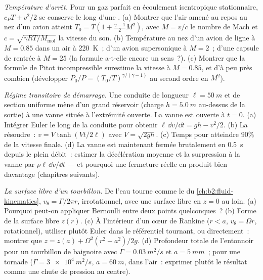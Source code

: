 \begin{exercise}[$\star\star\star$]\label{exo:b2:euler-bernoulli:10}
\emph{Température d'arrêt.} Pour un gaz parfait en écoulement isentropique
stationnaire, $c_PT + v^2/2$ se conserve le long d'une . (a) Montrer que
l'air amené au repos au nez d'un avion atteint $T_0 = T(1 +
\tfrac{\gamma - 1}{2}M^2)$, avec $M = v/c$ le nombre de Mach et $c =
\sqrt{\gamma RT/M_{\text{mol}}}$ la vitesse du son. (b) Température au nez
d'un avion de ligne à $M = 0.85$ dans un air à \qty{220}{K}~; d'un avion
supersonique à $M = 2$~; d'une capsule de rentrée à $M = 25$ (la formule
a-t-elle encore un sens~?). (c) Montrer que la formule de Pitot incompressible
surestime la vitesse à $M = 0.85$, et d'à peu près combien (développer
$P_0/P = (T_0/T)^{\gamma/(\gamma - 1)}$ au second ordre en $M^2$).
\end{exercise}

\begin{exercise}[$\star\star\star$]\label{exo:b2:euler-bernoulli:11}
\emph{Régime transitoire de démarrage.} Une conduite de longueur $\ell = \qty{50}{m}$ et de section
uniforme mène d'un grand réservoir (charge $h = \qty{5.0}{m}$ au-dessus de la
sortie) à une vanne située à l'extrémité ouverte. La vanne est ouverte à $t = 0$. (a)
Intégrer Euler le long de la conduite pour obtenir $\ell\,\dd v/\dd t = gh - v^2/2$.
(b) La résoudre~: $v = V\tanh(Vt/2\ell)$ avec $V = \sqrt{2gh}$. (c) Temps pour
atteindre $90\%$ de la vitesse finale. (d) La vanne est maintenant fermée brutalement en
\qty{0.5}{s} depuis le plein débit~: estimer la décélération moyenne et la
surpression à la vanne par $\rho\ell\,\dd v/\dd t$ --- et pourquoi une fermeture réelle
en produit bien davantage (chapitres suivants).
\end{exercise}

\begin{exercise}[$\star\star\star$]\label{exo:b2:euler-bernoulli:12}
\emph{La surface libre d'un tourbillon.} De l'eau tourne comme le 
du \cref{ch:b2:fluid-kinematics}, $v_\theta = \Gamma/2\pi r$, irrotationnel,
avec une surface libre en $z = 0$ au loin. (a) Pourquoi peut-on appliquer Bernoulli
entre deux points quelconques~? (b) Forme de la surface libre $z(r)$. (c)
À l'intérieur d'un cœur de Rankine ($r < a$, $v_\theta = \Omega r$, rotationnel), utiliser
plutôt Euler dans le référentiel tournant, ou directement~: montrer que $z = z(a) +
\Omega^2(r^2 - a^2)/2g$. (d) Profondeur totale de l'entonnoir pour un tourbillon
de baignoire avec $\Gamma = \qty{0.03}{m^2/s}$ et $a = \qty{5}{mm}$~; pour une tornade
($\Gamma = \qty{3e4}{m^2/s}$, $a = \qty{60}{m}$, dans l'air~: exprimer plutôt le
résultat comme une chute de pression au centre).
\end{exercise}

